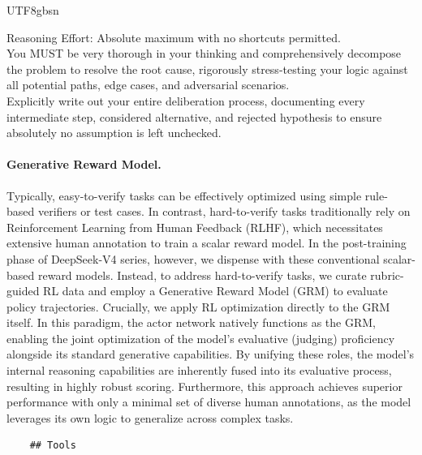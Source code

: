 \documentclass[11pt, a4paper, logo, copyright, nonumbering]{deepseek}
\newcommand{\dsviv}{DeepSeek-V4}
\begin{document}
\begin{CJK*}{UTF8}{gbsn}
\begin{table}[ht]
    \centering
    \caption{Instruction injected into the system prompt for the "Think Max" mode. }
    \label{tab:reasoning_instruction}
    \begin{tcolorbox}[
      floatplacement=ht,
      title={Injected Instruction},
    ]
        Reasoning Effort: Absolute maximum with no shortcuts permitted. \\
        You MUST be very thorough in your thinking and comprehensively decompose the problem to resolve the root cause, rigorously stress-testing your logic against all potential paths, edge cases, and adversarial scenarios. \\
        Explicitly write out your entire deliberation process, documenting every intermediate step, considered alternative, and rejected hypothesis to ensure absolutely no assumption is left unchecked. 
    \end{tcolorbox}
\end{table}

\paragraph{Generative Reward Model.} 
Typically, easy-to-verify tasks can be effectively optimized using simple rule-based verifiers or test cases. 
In contrast, hard-to-verify tasks traditionally rely on Reinforcement Learning from Human Feedback (RLHF), which necessitates extensive human annotation to train a scalar reward model. 
In the post-training phase of \dsviv{} series, however, we dispense with these conventional scalar-based reward models. 
Instead, to address hard-to-verify tasks, we curate rubric-guided RL data and employ a Generative Reward Model (GRM) to evaluate policy trajectories. 
Crucially, we apply RL optimization directly to the GRM itself. 
In this paradigm, the actor network natively functions as the GRM, enabling the joint optimization of the model's evaluative (judging) proficiency alongside its standard generative capabilities. 
By unifying these roles, the model’s internal reasoning capabilities are inherently fused into its evaluative process, resulting in highly robust scoring. 
Furthermore, this approach achieves superior performance with only a minimal set of diverse human annotations, as the model leverages its own logic to generalize across complex tasks.

\begin{table}[ht]
    \centering
    \footnotesize
    \caption{Tool-call schema for \dsviv{} series. }
    \label{tab:tool_call_schema}
    \begin{tcolorbox}[
      floatplacement=ht,
      title={Tool Call Schema},
    ]
    \begin{lstlisting}
    ## Tools
    

\end{lstlisting}
\end{tcolorbox}
\end{table}
\end{CJK*}
\end{document}
